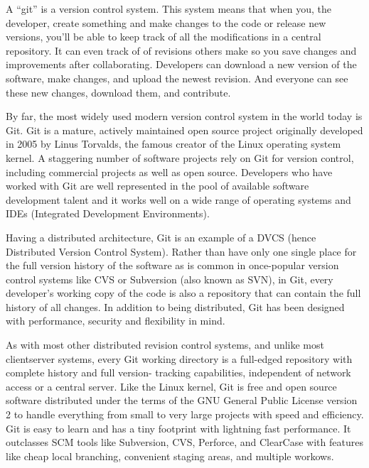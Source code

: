 A “git” is a version control system. This system means that when you, the developer, create something and make changes to the code or release new versions, you’ll be able to keep track of all the modifications in a central repository. It can even track of of revisions others make so you save changes and improvements after collaborating. Developers can download a new version of the software, make changes, and upload the newest revision. And everyone can see these new changes, download them, and contribute.

By far, the most widely used modern version control system in the world today is Git. Git is a mature, actively maintained open source project originally developed in 2005 by Linus Torvalds, the famous creator of the Linux operating system kernel. A staggering number of software projects rely on Git for version control, including commercial projects as well as open source. Developers who have worked with Git are well represented in the pool of available software development talent and it works well on a wide range of operating systems and IDEs (Integrated Development Environments). 

Having a distributed architecture, Git is an example of a DVCS (hence Distributed Version Control System). Rather than have only one single place for the full version history of the software as is common in once-popular version control systems like CVS or Subversion (also known as SVN), in Git, every developer's working copy of the code is also a repository that can contain the full history of all changes. In addition to being distributed, Git has been designed with performance, security and flexibility in mind.

As with most other distributed revision control systems, and unlike most clientserver systems, every Git working directory is a full-edged repository with complete history and full version- tracking capabilities, independent of network access or a central server. Like the Linux kernel, Git is free and open source software distributed under the terms of the GNU General Public License version 2 to handle everything from small to very large projects with speed and efficiency.
Git is easy to learn and has a tiny footprint with lightning fast performance. It outclasses SCM tools like Subversion, CVS, Perforce, and ClearCase with features like cheap local branching, convenient staging areas, and multiple workows.

